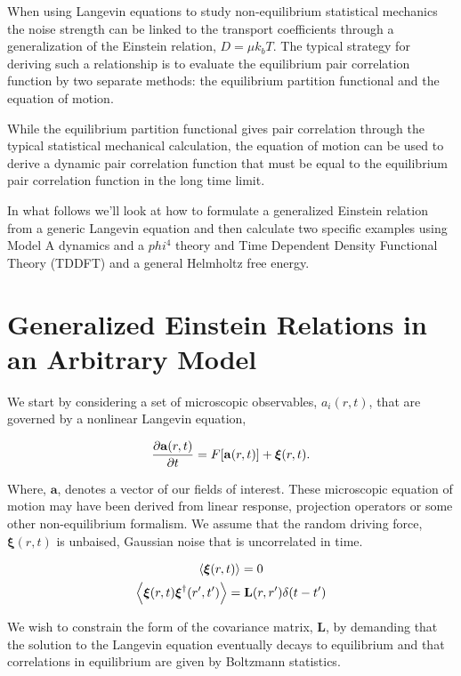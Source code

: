 When using Langevin equations to study non-equilibrium statistical mechanics the noise strength can be linked to the transport coefficients through a generalization of the Einstein relation, $D = \mu k_bT$. The typical strategy for deriving such a relationship is to evaluate the equilibrium pair correlation function by two separate methods: the equilibrium partition functional and the equation of motion.

While the equilibrium partition functional gives pair correlation through the typical statistical mechanical calculation, the equation of motion can be used to derive a dynamic pair correlation function that must be equal to the equilibrium pair correlation function in the long time limit.

In what follows we'll look at how to formulate a generalized Einstein relation from a generic Langevin equation and then calculate two specific examples using Model A dynamics and a $phi^4$ theory and Time Dependent Density Functional Theory (TDDFT) and a general Helmholtz free energy.

\section{Generalized Einstein Relations in an Arbitrary Model}

We start by considering a set of microscopic observables, $a_i(r, t)$, that are governed by a nonlinear Langevin equation,

\begin{equation}
	\frac{\partial \mathbf{a}(r, t)}{\partial t} = F[\mathbf{a}(r,t)] + \boldsymbol{\xi}(r,t).
\end{equation}

Where, $\mathbf{a}$, denotes a vector of our fields of interest. These microscopic equation of motion may have been derived from linear response, projection operators or some other non-equilibrium formalism. We assume that the random driving force, $\boldsymbol{\xi}(r, t)$ is unbaised, Gaussian noise that is uncorrelated in time.

\begin{gather}
	\left\langle \boldsymbol{\xi}(r,t)\right\rangle = 0 \\
	\left\langle \boldsymbol{\xi}(r,t)\boldsymbol{\xi}^\dagger(r^\prime,t^\prime)\right\rangle =
	\mathbf{L}(r, r^\prime)\delta(t-t^\prime)
\end{gather}

We wish to constrain the form of the covariance matrix, $\mathbf{L}$, by demanding that the solution to the Langevin equation eventually decays to equilibrium and that correlations in equilibrium are given by Boltzmann statistics.

